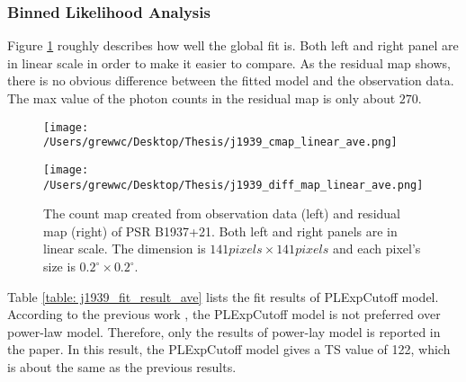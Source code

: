 \documentclass[12pt]{report}
\begin{document}
          \subsubsection{Binned Likelihood Analysis}
            Figure \ref{fig: j1939_count_map_diff_ave} roughly describes how well the global fit 
            is. Both left and right panel are in linear scale in order to make it easier to 
            compare. As the residual map shows, there is no obvious difference between the fitted 
            model and the observation data. The max value of the photon counts in the residual map 
            is only about $270$. 
            \begin{figure}[!ht]
              \begin{center}
              \begin{minipage}{0.45\textwidth}
                \begin{center} 
                  \texttt{[image: /Users/grewwc/Desktop/Thesis/j1939\_cmap\_linear\_ave.png]}
                \end{center}
              \end{minipage}
              \begin{minipage}{0.45\textwidth}
                \begin{center}
                  \texttt{[image: /Users/grewwc/Desktop/Thesis/j1939\_diff\_map\_linear\_ave.png]}
                \end{center}
              \end{minipage}
              \end{center}

              \caption{The count map created from observation data (left) and residual map (right)
                of PSR B1937+21. Both left and right panels are in linear scale. 
                The dimension is $141 pixels \times 141 pixels$ and each pixel's 
                size is $0.2^{\circ}\times0.2^{\circ}$.}
              \label{fig: j1939_count_map_diff_ave}
            \end{figure}

            Table \ref{table: j1939_fit_result_ave} lists the fit results of PLExpCutoff model. 
            According to the previous work \cite{0004-637X-787-2-167}, the PLExpCutoff model is not 
            preferred over power-law model. Therefore, only the results of power-lay model is 
            reported in the paper. In this result, the PLExpCutoff model gives a TS value of 122,
            which is about the same as the previous results. 
\end{document}
